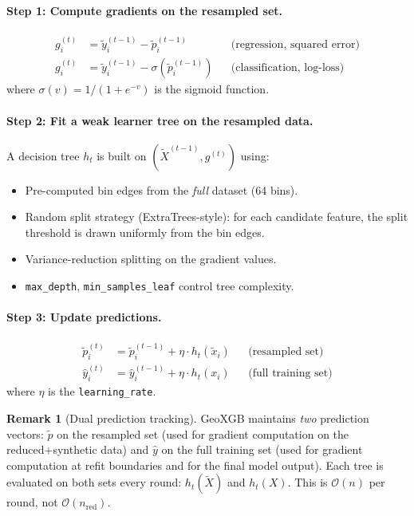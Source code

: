 \documentclass[11pt,a4paper]{article}
\theoremstyle{definition}
\newtheorem{remark}{Remark}
\begin{document}
\paragraph{Step 1: Compute gradients on the resampled set.}
\begin{align}
    g_i^{(t)} &= \tilde{y}_i^{(t-1)} - \tilde{p}_i^{(t-1)}
    && \text{(regression, squared error)} \\
    g_i^{(t)} &= \tilde{y}_i^{(t-1)} - \sigma(\tilde{p}_i^{(t-1)})
    && \text{(classification, log-loss)}
\end{align}
where $\sigma(v) = 1/(1 + e^{-v})$ is the sigmoid function.

\paragraph{Step 2: Fit a weak learner tree on the resampled data.}

A decision tree $h_t$ is built on $(\tilde{X}^{(t-1)}, g^{(t)})$ using:
\begin{itemize}[nosep]
    \item Pre-computed bin edges from the \emph{full} dataset (64 bins).
    \item Random split strategy (ExtraTrees-style): for each candidate feature,
        the split threshold is drawn uniformly from the bin edges.
    \item Variance-reduction splitting on the gradient values.
    \item \texttt{max\_depth}, \texttt{min\_samples\_leaf} control tree complexity.
\end{itemize}

\paragraph{Step 3: Update predictions.}
\begin{align}
    \tilde{p}_i^{(t)} &= \tilde{p}_i^{(t-1)} + \eta \cdot h_t(\tilde{x}_i)
    && \text{(resampled set)} \\
    \hat{y}_i^{(t)} &= \hat{y}_i^{(t-1)} + \eta \cdot h_t(x_i)
    && \text{(full training set)}
\end{align}
where $\eta$ is the \texttt{learning\_rate}.

\begin{remark}[Dual prediction tracking]
GeoXGB maintains \emph{two} prediction vectors:
$\tilde{p}$ on the resampled set (used for gradient computation on the
reduced+synthetic data) and $\hat{y}$ on the full training set (used for
gradient computation at refit boundaries and for the final model output).
Each tree is evaluated on both sets every round: $h_t(\tilde{X})$ and $h_t(X)$.
This is $\mathcal{O}(n)$ per round, not $\mathcal{O}(n_{\text{red}})$.
\end{remark}
\end{document}
